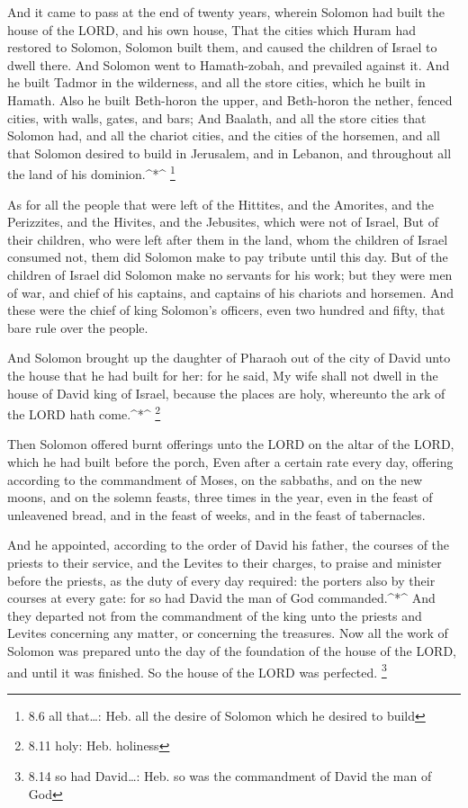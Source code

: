  And it came to pass at the end of twenty years, wherein
Solomon had built the house of the LORD, and his own house, 
That the cities which Huram had restored to Solomon, Solomon built them,
and caused the children of Israel to dwell there.  And
Solomon went to Hamath-zobah, and prevailed against it.  And
he built Tadmor in the wilderness, and all the store cities, which he
built in Hamath.  Also he built Beth-horon the upper, and
Beth-horon the nether, fenced cities, with walls, gates, and bars;
 And Baalath, and all the store cities that Solomon had, and
all the chariot cities, and the cities of the horsemen, and all that
Solomon desired to build in Jerusalem, and in Lebanon, and throughout
all the land of his dominion.\^{}*\^{} \footnote{8.6 all that\ldots:
  Heb. all the desire of Solomon which he desired to build}

 As for all the people that were left of the Hittites, and
the Amorites, and the Perizzites, and the Hivites, and the Jebusites,
which were not of Israel,  But of their children, who were
left after them in the land, whom the children of Israel consumed not,
them did Solomon make to pay tribute until this day.  But of
the children of Israel did Solomon make no servants for his work; but
they were men of war, and chief of his captains, and captains of his
chariots and horsemen.  And these were the chief of king
Solomon's officers, even two hundred and fifty, that bare rule over the
people.

 And Solomon brought up the daughter of Pharaoh out of the
city of David unto the house that he had built for her: for he said, My
wife shall not dwell in the house of David king of Israel, because the
places are holy, whereunto the ark of the LORD hath come.\^{}*\^{}
\footnote{8.11 holy: Heb. holiness}

 Then Solomon offered burnt offerings unto the LORD on the
altar of the LORD, which he had built before the porch, 
Even after a certain rate every day, offering according to the
commandment of Moses, on the sabbaths, and on the new moons, and on the
solemn feasts, three times in the year, even in the feast of unleavened
bread, and in the feast of weeks, and in the feast of tabernacles.

 And he appointed, according to the order of David his
father, the courses of the priests to their service, and the Levites to
their charges, to praise and minister before the priests, as the duty of
every day required: the porters also by their courses at every gate: for
so had David the man of God commanded.\^{}*\^{}  And they
departed not from the commandment of the king unto the priests and
Levites concerning any matter, or concerning the treasures.
 Now all the work of Solomon was prepared unto the day of
the foundation of the house of the LORD, and until it was finished. So
the house of the LORD was perfected. \footnote{8.14 so had David\ldots:
  Heb. so was the commandment of David the man of God}


